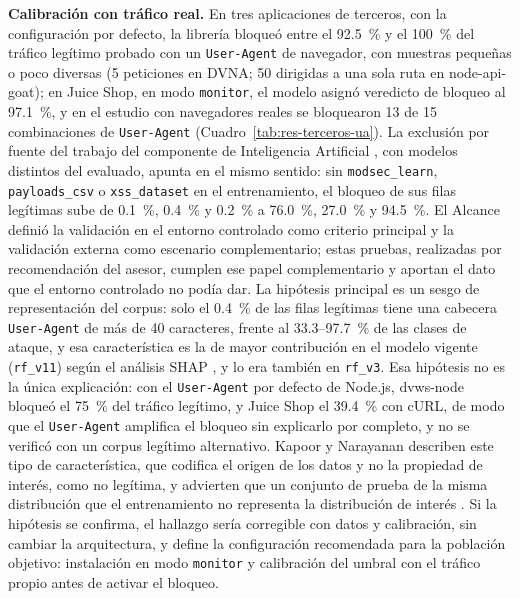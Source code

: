 \textbf{Calibración con tráfico real.} En tres aplicaciones de terceros, con la configuración por
defecto, la librería bloqueó entre el 92.5~\% y el 100~\% del tráfico legítimo probado con un
\texttt{User-Agent} de navegador, con muestras pequeñas o poco diversas (5 peticiones en DVNA; 50
dirigidas a una sola ruta en node-api-goat); en Juice Shop, en modo \texttt{monitor}, el modelo asignó
veredicto de bloqueo al 97.1~\%, y en el estudio con navegadores reales se bloquearon 13 de 15
combinaciones de \texttt{User-Agent} (Cuadro~\ref{tab:res-terceros-ua}). La exclusión por fuente del trabajo del componente de Inteligencia Artificial
\cite{valenzuela2026ia}, con modelos distintos del evaluado, apunta en el mismo
sentido: sin \texttt{modsec\_learn}, \texttt{payloads\_csv} o \texttt{xss\_dataset} en el entrenamiento, el
bloqueo de sus filas legítimas sube de 0.1~\%, 0.4~\% y 0.2~\% a 76.0~\%, 27.0~\% y 94.5~\%. El Alcance definió la validación en el entorno
controlado como criterio principal y la validación externa como escenario complementario; estas
pruebas, realizadas por recomendación del asesor, cumplen ese papel complementario y aportan el
dato que el entorno controlado no podía dar. La hipótesis principal es un sesgo de representación
del corpus: solo el 0.4~\% de las filas legítimas tiene una cabecera \texttt{User-Agent} de más de
40 caracteres, frente al 33.3--97.7~\% de las clases de ataque, y esa característica es la de mayor
contribución en el modelo vigente (\texttt{rf\_v11}) según el análisis SHAP \cite{lundberg2017unified,valenzuela2026ia}, y lo era también en
\texttt{rf\_v3}. Esa hipótesis no es la única explicación: con el \texttt{User-Agent} por defecto de
Node.js, dvws-node bloqueó el 75~\% del tráfico legítimo, y Juice Shop el 39.4~\% con cURL, de modo
que el \texttt{User-Agent} amplifica el bloqueo sin explicarlo por completo, y no se verificó con un
corpus legítimo alternativo. Kapoor y Narayanan describen este tipo
de característica, que codifica el origen de los datos y no la propiedad de interés, como no
legítima, y advierten que un conjunto de prueba de la misma distribución que el entrenamiento no
representa la distribución de interés \cite{kapoor2023}. Si la hipótesis se confirma, el hallazgo sería corregible con datos y
calibración, sin cambiar la arquitectura, y define la configuración recomendada para la población
objetivo: instalación en modo \texttt{monitor} y calibración del umbral con el tráfico propio antes
de activar el bloqueo.

